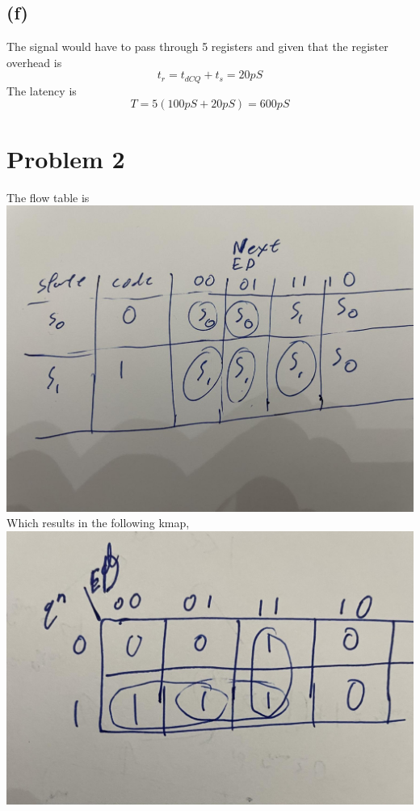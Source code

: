 \documentclass[12pt]{article}
\begin{document}
\subsection*{(f)}
The signal would have to pass through 5 registers and given that the register overhead is 
$$t_{r}=t_{dCQ}+t_s=20pS$$
The latency is 
$$T=5(100pS+20pS)=\boxed{600pS}$$
\section*{Problem 2}
The flow table is \\
\includegraphics[scale=0.2]{Fig6.jpg}\\
Which results in the following kmap, \\
\includegraphics[scale=0.2]{Fig3.jpg}\\
\end{document}
